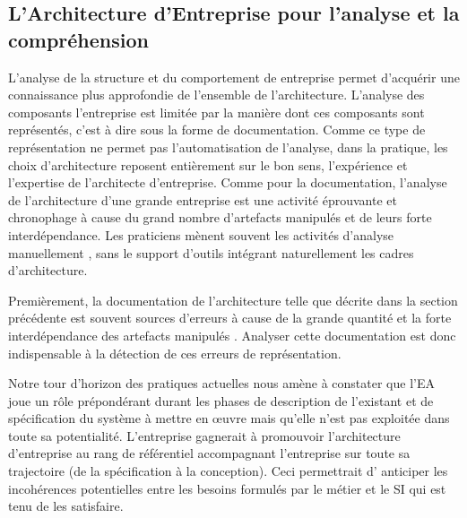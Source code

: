 	\subsection{L'Architecture d'Entreprise pour l'analyse et la compréhension}
	\label{sec:EA_analyse_limite}

L'analyse de la structure et du comportement de entreprise permet d'acquérir
une connaissance plus approfondie de l'ensemble de l'architecture. L'analyse des
composants l'entreprise est limitée par la manière dont ces composants sont
représentés, c'est à dire sous la forme de documentation. Comme ce type de
représentation ne permet pas l'automatisation de l'analyse, dans la pratique,
les choix d'architecture reposent entièrement sur le bon sens, l'expérience et
l'expertise de l'architecte d'entreprise. Comme pour la documentation, l'analyse
de l'architecture d'une grande entreprise est une activité éprouvante et
chronophage à cause du grand nombre d'artefacts manipulés et de leurs forte
interdépendance. Les praticiens mènent souvent les activités d'analyse
manuellement \cite{barn2013enterprise}, sans le support d'outils intégrant
naturellement les cadres d'architecture.

Premièrement, la documentation de l'architecture telle que décrite dans la
section précédente est souvent sources d'erreurs à cause de la grande quantité
et la forte interdépendance des artefacts manipulés
\cite{kaisler_enterprise_2005}. Analyser cette documentation est donc
indispensable à la détection de ces erreurs de représentation.

Notre tour d'horizon des pratiques actuelles nous amène à constater que l'EA
joue un rôle prépondérant durant les phases de description de l'existant et de
spécification du système à mettre en œuvre mais qu'elle n'est pas exploitée dans
toute sa potentialité. L'entreprise gagnerait à promouvoir l'architecture
d'entreprise au rang de référentiel accompagnant l'entreprise sur toute sa
trajectoire (de la spécification à la conception). Ceci permettrait d' anticiper
les incohérences potentielles entre les besoins formulés par le métier et le SI
qui est tenu de les satisfaire.

